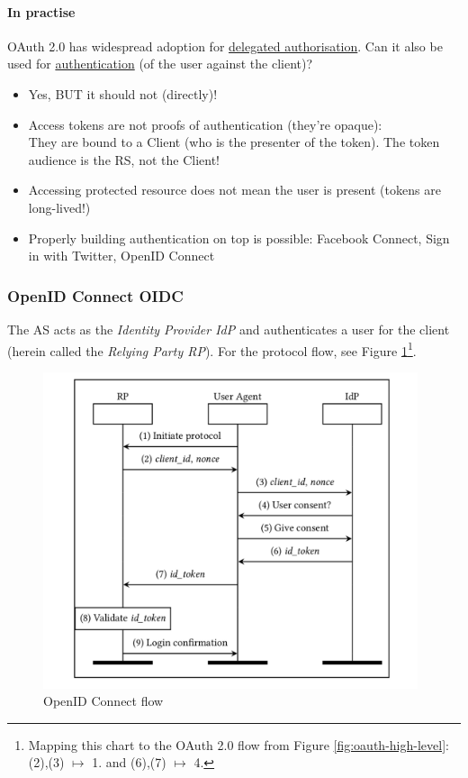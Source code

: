  \paragraph{In practise}
 OAuth 2.0 has widespread adoption for \underline{delegated authorisation}. Can it also be used for \underline{authentication} (of the user against the client)?
 
 \begin{itemize}
     \item Yes, BUT it should not (directly)!
     \item[\Lightning] Access tokens are not proofs of authentication (they're opaque):\\
     They are bound to a Client (who is the presenter of the token). The token audience is the RS, not the Client!
     \item[\Lightning] Accessing protected resource does not mean the user is present (tokens are long-lived!)
     \item Properly building authentication on top is possible: Facebook Connect, Sign in with Twitter, OpenID Connect
 \end{itemize}
 
\subsubsection{OpenID Connect OIDC} %

The AS acts as the \emph{Identity Provider IdP} and authenticates a user for the client (herein called the \emph{Relying Party RP}). For the protocol flow, see Figure \ref{fig:openid-connect}\footnote{Mapping this chart to the OAuth 2.0 flow from Figure \ref{fig:oauth-high-level}: (2),(3) $\mapsto$ 1. and (6),(7) $\mapsto$ 4.}.

\begin{figure}[h]
    \centering
    \includegraphics[width=11cm]{images/ch9-oauth-openid-connect.png}
    \caption{OpenID Connect flow}
    \label{fig:openid-connect}
\end{figure}

